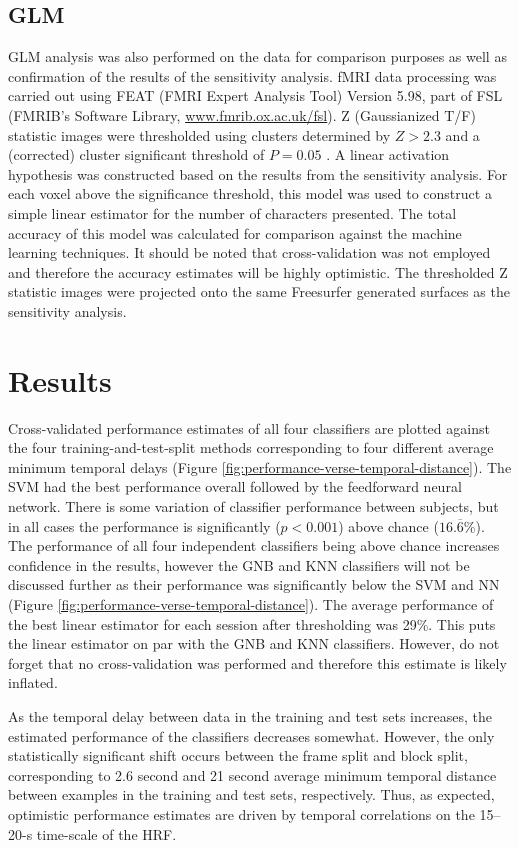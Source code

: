 \documentclass[5p,authoryear]{elsarticle}
\begin{document}
\subsection{GLM}
GLM analysis was also performed on the data for comparison purposes as well as confirmation of the results of the sensitivity analysis. 
fMRI data processing was carried out using FEAT (FMRI Expert Analysis Tool) Version 5.98, part of FSL (FMRIB's Software Library, \url{www.fmrib.ox.ac.uk/fsl}). 
Z (Gaussianized T/F) statistic images were thresholded using clusters determined by $Z > 2.3$ and a (corrected) cluster significant threshold of $P = 0.05$ \citep{Worsley2001}.
A linear activation hypothesis was constructed based on the results from the sensitivity analysis.
For each voxel above the significance threshold, this model was used to construct a simple linear estimator for the number of characters presented.
The total accuracy of this model was calculated for comparison against the machine learning techniques.
It should be noted that cross-validation was not employed and therefore the accuracy estimates will be highly optimistic.
The thresholded Z statistic images were projected onto the same Freesurfer generated surfaces as the sensitivity analysis.

\section{Results}
Cross-validated performance estimates of all four classifiers are plotted against the four training-and-test-split methods corresponding to four different average minimum temporal delays (Figure \ref{fig:performance-verse-temporal-distance}).
The SVM had the best performance overall followed by the feedforward neural network.
There is some variation of classifier performance between subjects, but in all cases the performance is significantly ($p < 0.001$) above chance ($16.\overline{6}$\%). 
The performance of all four independent classifiers being above chance increases confidence in the results, however the GNB and KNN classifiers will not be discussed further as their performance was significantly below the SVM and NN (Figure \ref{fig:performance-verse-temporal-distance}).
The average performance of the best linear estimator for each session after thresholding was 29\%.
This puts the linear estimator on par with the GNB and KNN classifiers.
However, do not forget that no cross-validation was performed and therefore this estimate is likely inflated.

As the temporal delay between data in the training and test sets increases, the estimated performance of the classifiers decreases somewhat.
However, the only statistically significant shift occurs between the frame split and block split, corresponding to 2.6 second and 21 second average minimum temporal distance between examples in the training and test sets, respectively.
Thus, as expected, optimistic performance estimates are driven by temporal correlations on the 15--20-s time-scale of the HRF.
\end{document}
